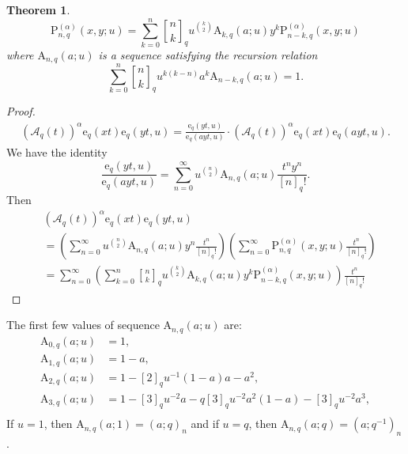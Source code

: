 \documentclass[12pt]{article}
\newcommand{\qbinom}{\genfrac{[}{]}{0pt}{}}
\newcommand{\e}{\mathrm{e}}
\newcommand{\A}{\mathcal{A}}
\newcommand{\p}{\mathrm{P}}
\newcommand{\AAA}{\mathrm{A}}
\newcommand{\B}{\mathrm{B}}%
\newtheorem{theorem}{Theorem}
\begin{document}
\begin{theorem}\label{theo_iden8}
    \begin{equation}
        \p_{n,q}^{(\alpha)}(x,y;u)=\sum_{k=0}^{n}\qbinom{n}{k}_{q}u^{\binom{k}{2}}\AAA_{k,q}(a;u)y^{k}\p_{n-k,q}^{(\alpha)}(x,y;u)
    \end{equation}
    where $\AAA_{n,q}(a;u)$ is a sequence satisfying the recursion relation
    \begin{equation}
        \sum_{k=0}^{n}\qbinom{n}{k}_{q}u^{k(k-n)}a^{k}\AAA_{n-k,q}(a;u)=1.    
    \end{equation}
\end{theorem}
\begin{proof}
    \begin{align*}
        (\A_{q}(t))^{\alpha}\e_{q}(xt)\e_{q}(yt,u)=\frac{\e_{q}(yt,u)}{\e_{q}(ayt,u)}\cdot(\A_{q}(t))^{\alpha}\e_{q}(xt)\e_{q}(ayt,u).
    \end{align*}
We have the identity
\begin{equation*}
    \frac{\e_{q}(yt,u)}{\e_{q}(ayt,u)}=\sum_{n=0}^{\infty}u^{\binom{n}{2}}\AAA_{n,q}(a;u)\frac{t^ny^n}{[n]_{q}!}.
\end{equation*}
Then
\begin{align*}
    &(\A_{q}(t))^{\alpha}\e_{q}(xt)\e_{q}(yt,u)\\
    &=\left(\sum_{n=0}^{\infty}u^{\binom{n}{2}}\AAA_{n,q}(a;u)y^n\frac{t^{n}}{[n]_{q}!}\right)\left(\sum_{n=0}^{\infty}\p_{n,q}^{(\alpha)}(x,y;u)\frac{t^n}{[n]_{q}!}\right)\\
    &=\sum_{n=0}^{\infty}\left(\sum_{k=0}^{n}\qbinom{n}{k}_{q}u^{\binom{k}{2}}\AAA_{k,q}(a;u)y^{k}\p_{n-k,q}^{(\alpha)}(x,y;u)\right)\frac{t^{n}}{[n]_{q}!}
\end{align*}
\end{proof}
The first few values of sequence $\AAA_{n,q}(a;u)$ are:
\begin{align*}
    \AAA_{0,q}(a;u)&=1,\\
    \AAA_{1,q}(a;u)&=1-a,\\
    \AAA_{2,q}(a;u)&=1-[2]_{q}u^{-1}(1-a)a-a^2,\\
    \AAA_{3,q}(a;u)&=1-[3]_{q}u^{-2}a-q[3]_{q}u^{-2}a^{2}(1-a)-[3]_{q}u^{-2}a^{3},\\
\end{align*}
If $u=1$, then $\AAA_{n,q}(a;1)=(a;q)_{n}$ and if $u=q$, then $\AAA_{n,q}(a;q)=(a;q^{-1})_{n}$.
\end{document}
